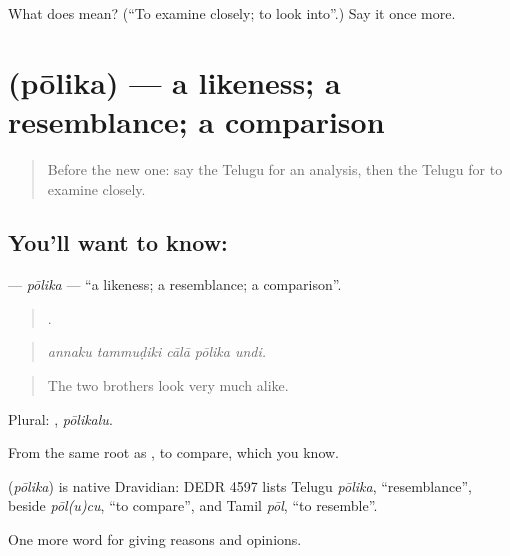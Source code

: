 \begin{tcolorbox}[breakable,colback=teal!4,colframe=teal!35!black,title={Before you move on}]
What does  mean? (\textquotedblleft{}To examine closely; to look into\textquotedblright{}.) Say it once more.
\end{tcolorbox}
\section[\texorpdfstring{\te{పోలిక} (pōlika)}{పోలిక (pōlika)}]{ (pōlika) — a likeness; a resemblance; a comparison}

\label{lesson:TE-C389-polika}



\begin{quote}
Before the new one: say the Telugu for an analysis, then the Telugu for to examine closely.
\end{quote}

\subsection*{You'll want to know: }
\textbf{} — \emph{pōlika} — \textquotedblleft{}a likeness; a resemblance; a comparison\textquotedblright{}.

\begin{quote}
    .
\end{quote}

\begin{quote}
\emph{annaku tammuḍiki cālā pōlika undi.}
\end{quote}

\begin{quote}
The two brothers look very much alike.
\end{quote}

Plural: , \emph{pōlikalu}.

From the same root as , to compare, which you know.

\begin{cousinweb}
\textbf{} (\emph{pōlika}) is native Dravidian: DEDR 4597 lists Telugu \emph{pōlika}, \textquotedblleft{}resemblance\textquotedblright{}, beside \emph{pōl(u)cu}, \textquotedblleft{}to compare\textquotedblright{}, and Tamil \emph{pōl}, \textquotedblleft{}to resemble\textquotedblright{}.
\end{cousinweb}

\begin{grammarlens}[title={What you've built}]
One more word for giving reasons and opinions.
\end{grammarlens}

